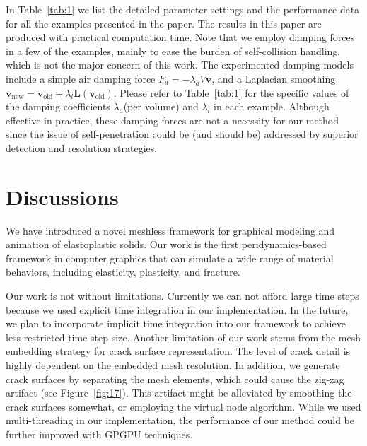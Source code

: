 In Table~\ref{tab:1} we list the detailed parameter settings and the performance data for all the examples presented in the paper. The results in this paper are produced with practical computation time. Note that we employ damping forces in a few of the examples, mainly to ease the burden of self-collision handling, which is not the major concern of this work. The experimented damping models include a simple air damping force $F_{d} = -\lambda_aV\mathbf{v}$, and a Laplacian smoothing $\mathbf{v}_{\mathrm{new}}=\mathbf{v}_{\mathrm{old}}+\lambda_l \mathbf{L}(\mathbf{v}_{\mathrm{old}})$. Please refer to Table~\ref{tab:1} for the specific values of the damping coefficients $\lambda_a$(per volume) and $\lambda_l$ in each example. Although effective in practice, these damping forces are not a necessity for our method since the issue of self-penetration could be (and should be) addressed by superior detection and resolution strategies.

\section{Discussions}
We have introduced a novel meshless framework for graphical modeling and animation of elastoplastic solids. Our work is the first peridynamics-based framework in computer graphics that can simulate a wide range of material behaviors, including elasticity, plasticity, and fracture.

Our work is not without limitations. Currently we can not afford large time steps because we used explicit time integration in our implementation. In the future, we plan to incorporate implicit time integration into our framework to achieve less restricted time step size. Another limitation of our work stems from the mesh embedding strategy for crack surface representation. The level of crack detail is highly dependent on the embedded mesh resolution. In addition, we generate crack surfaces by separating the mesh elements, which could cause the zig-zag artifact (see Figure~\ref{fig:17}). This artifact might be alleviated by smoothing the crack surfaces somewhat, or employing the virtual node algorithm. While we used multi-threading in our implementation, the performance of our method could be further improved with GPGPU techniques.

